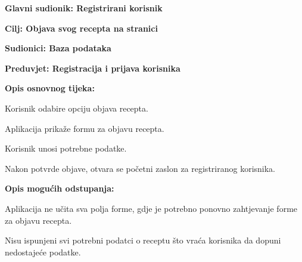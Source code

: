 					\noindent {}
					\begin{packed_item}
						
						\item \textbf{Glavni sudionik: Registrirani korisnik }
						\item  \textbf{Cilj: Objava svog recepta na stranici} 
						\item  \textbf{Sudionici: Baza podataka} 
						\item  \textbf{Preduvjet: Registracija i prijava korisnika} 
						\item  \textbf{Opis osnovnog tijeka:}
						
						\item[] \begin{packed_enum}
							
							\item Korisnik odabire opciju objava recepta.
							\item Aplikacija prikaže formu za objavu recepta.
							\item Korisnik unosi potrebne podatke.
							\item Nakon potvrde objave, otvara se početni zaslon za registriranog korisnika.
						\end{packed_enum}
						
						\item  \textbf{Opis mogućih odstupanja:}
						
						\item[] \begin{packed_item}
							
							\item[2.a] Aplikacija ne učita sva polja forme, gdje je potrebno ponovno zahtjevanje forme za objavu recepta. 
							\item[3.a] Nisu ispunjeni svi potrebni podatci o receptu što vraća korisnika da dopuni nedostajeće podatke.
							
						\end{packed_item}
					\end{packed_item}
					
